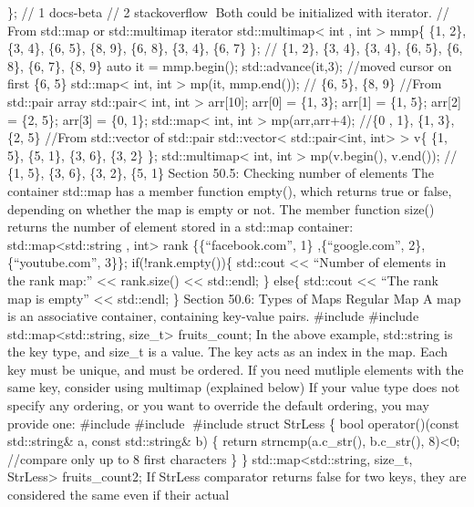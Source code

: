 \}; // 1 docs-beta // 2 stackoverflow Both could be initialized with
iterator. // From std::map or std::multimap iterator
std::multimap\textless{} int , int \textgreater{} mmp\{ \{1, 2\}, \{3,
4\}, \{6, 5\}, \{8, 9\}, \{6, 8\}, \{3, 4\}, \{6, 7\} \}; // \{1, 2\},
\{3, 4\}, \{3, 4\}, \{6, 5\}, \{6, 8\}, \{6, 7\}, \{8, 9\} auto it =
mmp.begin(); std::advance(it,3); //moved cursor on first \{6, 5\}
std::map\textless{} int, int \textgreater{} mp(it, mmp.end()); // \{6,
5\}, \{8, 9\} //From std::pair array std::pair\textless{} int, int
\textgreater{} arr{[}10{]}; arr{[}0{]} = \{1, 3\}; arr{[}1{]} = \{1,
5\}; arr{[}2{]} = \{2, 5\}; arr{[}3{]} = \{0, 1\}; std::map\textless{}
int, int \textgreater{} mp(arr,arr+4); //\{0 , 1\}, \{1, 3\}, \{2, 5\}
//From std::vector of std::pair std::vector\textless{}
std::pair\textless int, int\textgreater{} \textgreater{} v\{ \{1, 5\},
\{5, 1\}, \{3, 6\}, \{3, 2\} \}; std::multimap\textless{} int, int
\textgreater{} mp(v.begin(), v.end()); // \{1, 5\}, \{3, 6\}, \{3, 2\},
\{5, 1\} Section 50.5: Checking number of elements The container
std::map has a member function empty(), which returns true or false,
depending on whether the map is empty or not. The member function size()
returns the number of element stored in a std::map container:
std::map\textless std::string , int\textgreater{} rank
\{\{``facebook.com'', 1\} ,\{``google.com'', 2\}, \{``youtube.com'',
3\}\}; if(!rank.empty())\{ std::cout \textless\textless{} ``Number of
elements in the rank map:'' \textless\textless{} rank.size()
\textless\textless{} std::endl; \} else\{ std::cout \textless\textless{}
``The rank map is empty'' \textless\textless{} std::endl; \} Section
50.6: Types of Maps Regular Map A map is an associative container,
containing key-value pairs. \#include \#include
std::map\textless std::string, size\_t\textgreater{} fruits\_count; In
the above example, std::string is the key type, and size\_t is a value.
The key acts as an index in the map. Each key must be unique, and must
be ordered. If you need mutliple elements with the same key, consider
using multimap (explained below) If your value type does not specify any
ordering, or you want to override the default ordering, you may provide
one: \#include \#include \#include struct StrLess \{ bool
operator()(const std::string\& a, const std::string\& b) \{ return
strncmp(a.c\_str(), b.c\_str(), 8)\textless0; //compare only up to 8
first characters \} \} std::map\textless std::string, size\_t,
StrLess\textgreater{} fruits\_count2; If StrLess comparator returns
false for two keys, they are considered the same even if their actual
